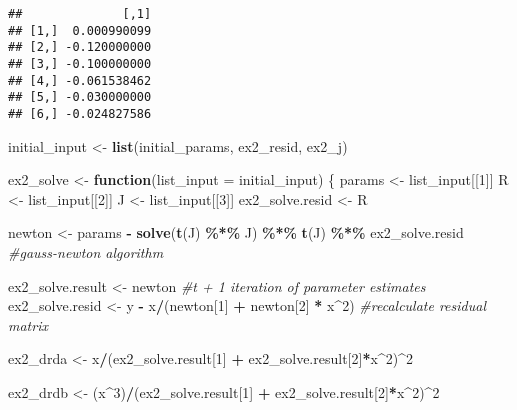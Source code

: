 \documentclass[
]{article}
\newenvironment{Shaded}{\begin{snugshade}}{\end{snugshade}}
\newcommand{\CommentTok}[1]{\textcolor[rgb]{0.56,0.35,0.01}{\textit{#1}}}
\newcommand{\ControlFlowTok}[1]{\textcolor[rgb]{0.13,0.29,0.53}{\textbf{#1}}}
\newcommand{\DataTypeTok}[1]{\textcolor[rgb]{0.13,0.29,0.53}{#1}}
\newcommand{\DecValTok}[1]{\textcolor[rgb]{0.00,0.00,0.81}{#1}}
\newcommand{\KeywordTok}[1]{\textcolor[rgb]{0.13,0.29,0.53}{\textbf{#1}}}
\newcommand{\NormalTok}[1]{#1}
\newcommand{\OperatorTok}[1]{\textcolor[rgb]{0.81,0.36,0.00}{\textbf{#1}}}
\newcommand{\StringTok}[1]{\textcolor[rgb]{0.31,0.60,0.02}{#1}}
\begin{document}
\begin{verbatim}
##              [,1]
## [1,]  0.000990099
## [2,] -0.120000000
## [3,] -0.100000000
## [4,] -0.061538462
## [5,] -0.030000000
## [6,] -0.024827586
\end{verbatim}

\begin{Shaded}
\begin{Highlighting}[]
\NormalTok{initial\_input \textless{}{-}}\StringTok{ }\KeywordTok{list}\NormalTok{(initial\_params, ex2\_resid, ex2\_j)}

\NormalTok{ex2\_solve \textless{}{-}}\StringTok{ }\ControlFlowTok{function}\NormalTok{(}\DataTypeTok{list\_input =}\NormalTok{ initial\_input) \{}
\NormalTok{  params \textless{}{-}}\StringTok{ }\NormalTok{list\_input[[}\DecValTok{1}\NormalTok{]]}
\NormalTok{  R \textless{}{-}}\StringTok{ }\NormalTok{list\_input[[}\DecValTok{2}\NormalTok{]]}
\NormalTok{  J \textless{}{-}}\StringTok{ }\NormalTok{list\_input[[}\DecValTok{3}\NormalTok{]]}
\NormalTok{  ex2\_solve.resid \textless{}{-}}\StringTok{ }\NormalTok{R}
  
\NormalTok{  newton \textless{}{-}}\StringTok{ }\NormalTok{params }\OperatorTok{{-}}\StringTok{ }\KeywordTok{solve}\NormalTok{(}\KeywordTok{t}\NormalTok{(J) }\OperatorTok{\%*\%}\StringTok{ }\NormalTok{J) }\OperatorTok{\%*\%}\StringTok{ }\KeywordTok{t}\NormalTok{(J) }\OperatorTok{\%*\%}\StringTok{ }\NormalTok{ex2\_solve.resid }\CommentTok{\#gauss{-}newton algorithm}
  
\NormalTok{  ex2\_solve.result \textless{}{-}}\StringTok{ }\NormalTok{newton }\CommentTok{\#t + 1 iteration of parameter estimates}
\NormalTok{  ex2\_solve.resid \textless{}{-}}\StringTok{ }\NormalTok{y }\OperatorTok{{-}}\StringTok{ }\NormalTok{x}\OperatorTok{/}\NormalTok{(newton[}\DecValTok{1}\NormalTok{] }\OperatorTok{+}\StringTok{ }\NormalTok{newton[}\DecValTok{2}\NormalTok{] }\OperatorTok{*}\StringTok{ }\NormalTok{x}\OperatorTok{\^{}}\DecValTok{2}\NormalTok{) }\CommentTok{\#recalculate residual matrix}
  
\NormalTok{  ex2\_drda \textless{}{-}}\StringTok{ }\NormalTok{x}\OperatorTok{/}\NormalTok{(ex2\_solve.result[}\DecValTok{1}\NormalTok{] }\OperatorTok{+}\StringTok{ }\NormalTok{ex2\_solve.result[}\DecValTok{2}\NormalTok{]}\OperatorTok{*}\NormalTok{x}\OperatorTok{\^{}}\DecValTok{2}\NormalTok{)}\OperatorTok{\^{}}\DecValTok{2}

\NormalTok{  ex2\_drdb \textless{}{-}}\StringTok{ }\NormalTok{(x}\OperatorTok{\^{}}\DecValTok{3}\NormalTok{)}\OperatorTok{/}\NormalTok{(ex2\_solve.result[}\DecValTok{1}\NormalTok{] }\OperatorTok{+}\StringTok{ }\NormalTok{ex2\_solve.result[}\DecValTok{2}\NormalTok{]}\OperatorTok{*}\NormalTok{x}\OperatorTok{\^{}}\DecValTok{2}\NormalTok{)}\OperatorTok{\^{}}\DecValTok{2}


\end{Highlighting}
\end{Shaded}
\end{document}
